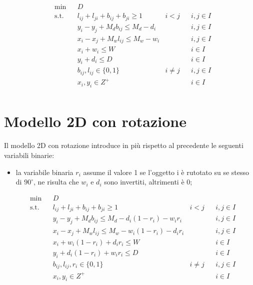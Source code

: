 \begin{equation*}
    \begin{aligned}
    & \underset{}{\text{min}}
    & & D \\
    & \text{s.t.} & &  l_{ij} + l_{ji} + b_{ij} + b_{ji} \geq 1 & i < j & & i,j \in I \\
    & & & y_i - y_j + M_d b_{ij} \leq M_d - d_i & & & i,j \in I \\
    & & & x_i - x_j + M_w l_{ij} \leq M_w - w_i & & & i,j \in I \\
    & & & x_i + w_i \leq W & & & i \in I \\
    & & & y_i + d_i \leq D & & & i \in I \\
    & & & b_{ij}, l_{ij} \in \{0,1\} & i \neq j & & i,j \in I \\
    & & & x_{i}, y_{i} \in Z^{+} & & & i \in I \\
    \end{aligned}
\end{equation*}

\newpage

\section{Modello 2D con rotazione}
Il modello 2D con rotazione introduce in più rispetto al precedente le seguenti variabili binarie:
\begin{itemize}
    \item la variabile binaria $r_{i}$ assume il valore 1 se l'oggetto i è rutotato su se stesso di $90^{\circ}$, ne risulta che $w_{i}$ e $d_{i}$ sono invertiti, altrimenti è 0;
\end{itemize}

\begin{equation*}
    \begin{aligned}
    & \underset{}{\text{min}}
    & & D \\
    & \text{s.t.} & &  l_{ij} + l_{ji} + b_{ij} + b_{ji} \geq 1 & i < j & & i,j \in I \\
    & & & y_i - y_j + M_d b_{ij} \leq M_d - d_i (1 - r_i) - w_i r_i & & & i,j \in I \\
    & & & x_i - x_j + M_w l_{ij} \leq M_w - w_i (1 - r_i) - d_i r_i & & & i,j \in I \\
    & & & x_i + w_i (1 - r_i) + d_i r_i \leq W & & & i \in I \\
    & & & y_i + d_i (1 - r_i) + w_i r_i \leq D & & & i \in I \\
    & & & b_{ij}, l_{ij}, r_i \in \{0,1\} & i \neq j & & i,j \in I \\
    & & & x_{i}, y_{i} \in Z^{+} & & & i \in I \\
    \end{aligned}
\end{equation*}

